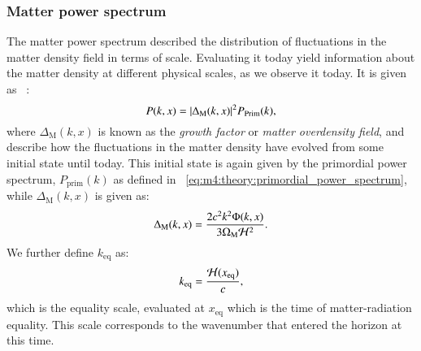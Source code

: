     \subsubsection{Matter power spectrum}
        The matter power spectrum described the distribution of fluctuations in the matter density field in terms of scale. Evaluating it today yield information about the matter density at different physical scales, as we observe it today. It is given as ~\cite{AST5220LectureNotes}:
        \begin{equation}\label{eq:m4:theory:matter_power_spectrum}
            P(k,x) = \abs{\Delta_\mathrm{M}(k,x)}^2P_\mathrm{Prim}(k),
        \end{equation}
        where $\Delta_\mathrm{M}(k,x)$ is known as the \textit{growth factor} or \textit{matter overdensity field}, and describe how the fluctuations in the matter density have evolved from some initial state until today. This initial state is again given by the primordial power spectrum, $P_\mathrm{prim}(k)$ as defined in ~\cref{eq:m4:theory:primordial_power_spectrum}, while $\Delta_\mathrm{M}(k,x)$ is given as:
        \begin{equation}\label{eq:m4:theory:growth_factor}
            \Delta_\mathrm{M}(k,x) = \frac{2c^2k^2\Phi(k,x)}{3\Omega_\mathrm{M}\mathcal{H}^2}.
        \end{equation}
        We further define $k_\mathrm{eq}$ as:
        \begin{equation}\label{eq:m4:theory:mps_keq}
            k_\mathrm{eq} = \frac{\mathcal{H}(x_\mathrm{eq})}{c},
        \end{equation}
        which is the equality scale, evaluated at $x_\mathrm{eq}$ which is the time of matter-radiation equality. This scale corresponds to the wavenumber that entered the horizon at this time. 
